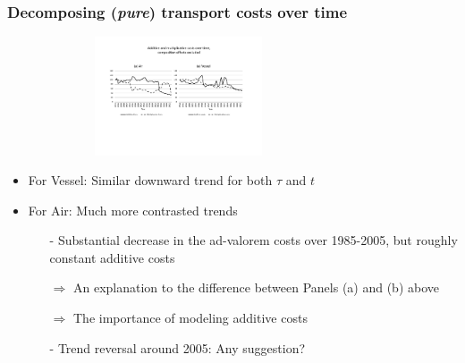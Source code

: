 \documentclass[10 pt,Helvetica, french]{beamer}
\begin{document}
\begin{frame}
\frametitle{Decomposing (\textit{pure}) transport costs over time }
\begin{figure}[htbp]
\begin{center}
\includegraphics[width=8cm, height=3.5cm]{Fig3b_TCovertime_add_et_mult_3d.pdf}
\end{center}
\end{figure}
\begin{itemize}
\item For Vessel: Similar downward trend for both $\tau$ and $t$  \vspace{0.1cm}
\item For Air: Much more contrasted trends  \vspace{0.1cm}
\begin{itemize}
\item[-] Substantial decrease in the ad-valorem costs over 1985-2005, but roughly constant additive costs  \vspace{0.1cm}
\item[$\Rightarrow$] An explanation to the difference between Panels (a) and (b) above  \vspace{0.1cm}

\item[$\Rightarrow$] The importance of modeling additive costs  \vspace{0.1cm}
\item[-] Trend reversal around 2005: Any suggestion?
\end{itemize}
\end{itemize}
\end{frame}
\end{document}
